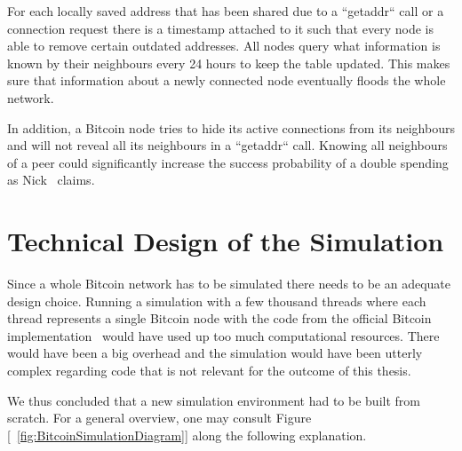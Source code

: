 \documentclass[a4paper, oneside]{discothesis}
\begin{document}
For each locally saved address that has been shared due to a ``getaddr`` call or a connection request there is a timestamp attached to it such that every node is able to remove certain outdated addresses.
All nodes query what information is known by their neighbours every 24 hours to keep the table updated. This makes sure that information about a newly connected node eventually floods the whole network.

In addition, a Bitcoin node tries to hide its active connections from its neighbours and will not reveal all its neighbours in a ``getaddr`` call. Knowing all neighbours of a peer could significantly increase the success probability of a double spending as Nick~\cite{guessingP2P} claims.

\section{Technical Design of the Simulation}
Since a whole Bitcoin network has to be simulated there needs to be an adequate design choice. Running a simulation with a few thousand threads where each thread represents a single Bitcoin node with the code from the official Bitcoin implementation~\cite{GithubBitcoin} would have used up too much computational resources. There would have been a big overhead and the simulation would have been utterly complex regarding code that is not relevant for the outcome of this thesis.

We thus concluded that a new simulation environment had to be built from scratch. For a general overview, one may consult Figure [~\ref{fig:BitcoinSimulationDiagram}] along the following explanation.
\end{document}
